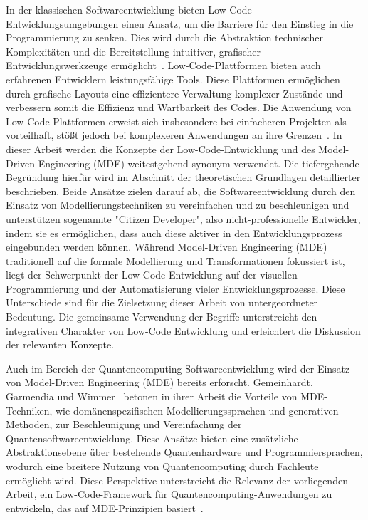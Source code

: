 In der klassischen Softwareentwicklung bieten Low-Code-Entwicklungsumgebungen einen Ansatz, 
um die Barriere für den Einstieg in die Programmierung zu senken. Dies wird durch die 
Abstraktion technischer Komplexitäten und die Bereitstellung intuitiver, grafischer 
Entwicklungswerkzeuge ermöglicht~\cite{Juhas2022}. Low-Code-Plattformen bieten auch 
erfahrenen Entwicklern leistungsfähige Tools. 
Diese Plattformen ermöglichen durch grafische Layouts eine effizientere Verwaltung komplexer 
Zustände und verbessern somit die Effizienz und Wartbarkeit des Codes. Die
Anwendung von Low-Code-Plattformen erweist sich insbesondere bei
einfacheren Projekten als vorteilhaft, stößt jedoch bei komplexeren
Anwendungen an ihre Grenzen~\cite{Buscher2022}. 
In dieser Arbeit werden die Konzepte der Low-Code-Entwicklung und des Model-Driven Engineering (MDE) 
weitestgehend synonym verwendet. Die tiefergehende Begründung hierfür 
wird im Abschnitt der theoretischen Grundlagen detaillierter beschrieben. 
Beide Ansätze zielen darauf ab, die Softwareentwicklung durch 
den Einsatz von Modellierungstechniken zu vereinfachen und zu beschleunigen und 
unterstützen sogenannte "Citizen Developer", also nicht-professionelle Entwickler, 
indem sie es ermöglichen, dass auch diese aktiver in den Entwicklungsprozess eingebunden werden können.
Während Model-Driven Engineering (MDE) traditionell auf die formale Modellierung und 
Transformationen fokussiert ist, liegt der Schwerpunkt der Low-Code-Entwicklung auf der 
visuellen Programmierung und der Automatisierung vieler Entwicklungsprozesse. 
Diese Unterschiede sind für die Zielsetzung dieser Arbeit von untergeordneter Bedeutung. 
Die gemeinsame Verwendung der Begriffe unterstreicht den integrativen Charakter 
von Low-Code Entwicklung und erleichtert die Diskussion der relevanten Konzepte. 


Auch im Bereich der Quantencomputing-Softwareentwicklung wird der Einsatz von 
Model-Driven Engineering (MDE) bereits erforscht. Gemeinhardt, Garmendia und Wimmer~\cite{gemeinhardt_2021} 
betonen in ihrer Arbeit die Vorteile von MDE-Techniken, wie domänenspezifischen 
Modellierungssprachen und generativen Methoden, zur Beschleunigung und Vereinfachung 
der Quantensoftwareentwicklung. Diese Ansätze bieten eine zusätzliche Abstraktionsebene 
über bestehende Quantenhardware und Programmiersprachen, wodurch eine breitere Nutzung 
von Quantencomputing durch Fachleute ermöglicht wird. Diese Perspektive unterstreicht 
die Relevanz der vorliegenden Arbeit, ein Low-Code-Framework für Quantencomputing-Anwendungen 
zu entwickeln, das auf MDE-Prinzipien basiert~\cite{gemeinhardt_2021}.

